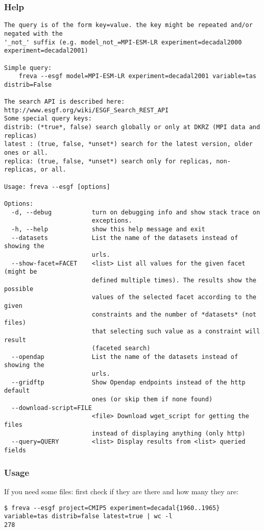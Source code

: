 \documentclass[a4paper,11pt]{ltxdoc}
\begin{document}
\subsubsection*{Help}

\begin{verbatim}
The query is of the form key=value. the key might be repeated and/or negated with the 
'_not_' suffix (e.g. model_not_=MPI-ESM-LR experiment=decadal2000 experiment=decadal2001)

Simple query:
    freva --esgf model=MPI-ESM-LR experiment=decadal2001 variable=tas distrib=False

The search API is described here: http://www.esgf.org/wiki/ESGF_Search_REST_API
Some special query keys:
distrib: (*true*, false) search globally or only at DKRZ (MPI data and replicas)
latest : (true, false, *unset*) search for the latest version, older ones or all.
replica: (true, false, *unset*) search only for replicas, non-replicas, or all.

Usage: freva --esgf [options]

Options:
  -d, --debug           turn on debugging info and show stack trace on
                        exceptions.
  -h, --help            show this help message and exit
  --datasets            List the name of the datasets instead of showing the
                        urls.
  --show-facet=FACET    <list> List all values for the given facet (might be
                        defined multiple times). The results show the possible
                        values of the selected facet according to the given
                        constraints and the number of *datasets* (not files)
                        that selecting such value as a constraint will result
                        (faceted search)
  --opendap             List the name of the datasets instead of showing the
                        urls.
  --gridftp             Show Opendap endpoints instead of the http default
                        ones (or skip them if none found)
  --download-script=FILE
                        <file> Download wget_script for getting the files
                        instead of displaying anything (only http)
  --query=QUERY         <list> Display results from <list> queried fields

\end{verbatim}
\subsubsection*{Usage}
If you need some files: first check if they are there and how many they are:
\begin{verbatim}
$ freva --esgf project=CMIP5 experiment=decadal{1960..1965} variable=tas distrib=false latest=true | wc -l
278
\end{verbatim}
\end{document}
